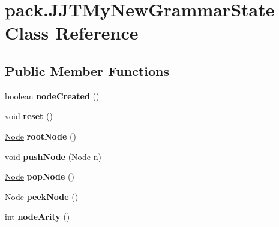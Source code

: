 \hypertarget{classpack_1_1_j_j_t_my_new_grammar_state}{}\section{pack.\+J\+J\+T\+My\+New\+Grammar\+State Class Reference}
\label{classpack_1_1_j_j_t_my_new_grammar_state}
\subsection*{Public Member Functions}
\begin{DoxyCompactItemize}
\item 
boolean {\bfseries node\+Created} ()\hypertarget{classpack_1_1_j_j_t_my_new_grammar_state_ab898e5c84b4f28a6a49c106b344afe0a}{}\label{classpack_1_1_j_j_t_my_new_grammar_state_ab898e5c84b4f28a6a49c106b344afe0a}

\item 
void {\bfseries reset} ()\hypertarget{classpack_1_1_j_j_t_my_new_grammar_state_aa4e6a71e4d5fe490a1263ebe7af192f0}{}\label{classpack_1_1_j_j_t_my_new_grammar_state_aa4e6a71e4d5fe490a1263ebe7af192f0}

\item 
\hyperlink{interfacepack_1_1_node}{Node} {\bfseries root\+Node} ()\hypertarget{classpack_1_1_j_j_t_my_new_grammar_state_a9397766b9395e87ac402194b54689e67}{}\label{classpack_1_1_j_j_t_my_new_grammar_state_a9397766b9395e87ac402194b54689e67}

\item 
void {\bfseries push\+Node} (\hyperlink{interfacepack_1_1_node}{Node} n)\hypertarget{classpack_1_1_j_j_t_my_new_grammar_state_aaf0c2abd8086dfd80dc2c4894c02c2ee}{}\label{classpack_1_1_j_j_t_my_new_grammar_state_aaf0c2abd8086dfd80dc2c4894c02c2ee}

\item 
\hyperlink{interfacepack_1_1_node}{Node} {\bfseries pop\+Node} ()\hypertarget{classpack_1_1_j_j_t_my_new_grammar_state_ac36db6554817506b77d1d8005d4e5171}{}\label{classpack_1_1_j_j_t_my_new_grammar_state_ac36db6554817506b77d1d8005d4e5171}

\item 
\hyperlink{interfacepack_1_1_node}{Node} {\bfseries peek\+Node} ()\hypertarget{classpack_1_1_j_j_t_my_new_grammar_state_a13ac2cdc3a4cc1c96bbddc51bf16cadb}{}\label{classpack_1_1_j_j_t_my_new_grammar_state_a13ac2cdc3a4cc1c96bbddc51bf16cadb}

\item 
int {\bfseries node\+Arity} ()\hypertarget{classpack_1_1_j_j_t_my_new_grammar_state_a0c7f18457f09977ff21c009e93e9506d}{}\label{classpack_1_1_j_j_t_my_new_grammar_state_a0c7f18457f09977ff21c009e93e9506d}


\end{DoxyCompactItemize}
